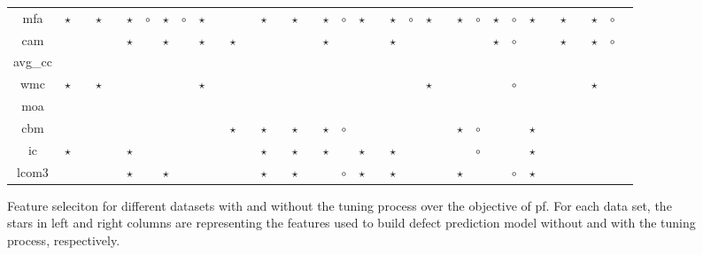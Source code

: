 \begin{figure*}[!ht]
\begin{tabular}{c|c c|c c|c c|c c|c c|c c|c c|c c|c c|c c|c c|c c|c c|c c|c c|c c|c c|c }
mfa& $\star$& & $\star$& & $\star$& $\circ$& $\star$& $\circ$& $\star$& & & & $\star$& & $\star$& & $\star$& $\circ$& $\star$& & $\star$& $\circ$& $\star$& & $\star$& $\circ$& $\star$& $\circ$& $\star$& & $\star$& & $\star$& $\circ$\\
cam& & & & & $\star$& & $\star$& & $\star$& & $\star$& & & & & & $\star$& & & & $\star$& & & & & & $\star$& $\circ$& & & $\star$& & $\star$& $\circ$\\
avg\_cc& & & & & & & & & & & & & & & & & & & & & & & & & & & & & & & & & & \\
wmc& $\star$& & $\star$& & & & & & $\star$& & & & & & & & & & & & & & $\star$& & & & & $\circ$& & & & & $\star$& \\
moa& & & & & & & & & & & & & & & & & & & & & & & & & & & & & & & & & & \\
cbm& & & & & & & & & & & $\star$& & $\star$& & $\star$& & $\star$& $\circ$& & & & & & & $\star$& $\circ$& & & $\star$& & & & & \\
ic& $\star$& & & & $\star$& & & & & & & & $\star$& & $\star$& & $\star$& & $\star$& & $\star$& & & & & $\circ$& & & $\star$& & & & & \\
lcom3& & & & & $\star$& & $\star$& & & & & & $\star$& & $\star$& & & $\circ$& $\star$& & $\star$& & & & $\star$& & & $\circ$& $\star$& & & & & \\

  \end{tabular}
      \caption{Feature seleciton for different datasets with  and without the tuning process over the objective of pf. For each data set, the stars in left and right columns are representing the features used to build defect prediction model without and with the tuning process, respectively.
 }
\end{figure*}

